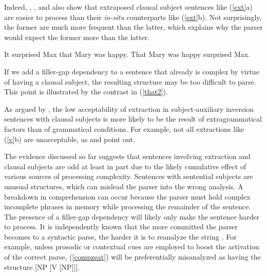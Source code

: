 \documentclass[output=paper,biblatex,babelshorthands,newtxmath,draftmode,colorlinks,citecolor=brown]{langscibook}
\begin{document}
\eal  \label{exps}
\zl


\noindent
Indeed, \citet{fodor67}, \citet{bever}, and \citet{frazier88} also show that extraposed clausal
subject sentences like (\ref{ext}a) are easier to process than their \textit{in-situ} counterparts
like (\ref{ext}b).  Not surprisingly, the former are much more frequent than the latter, which
explains why the parser would expect the former more than the latter.


\eal  \label{ext}
\ex It surprised Max that Mary was happy. 
\ex That Mary was happy surprised Max.
\zl

  
If we add a filler-gap dependency to a sentence that already is complex by virtue of having a
clausal subject, the resulting structure may be too difficult to parse.  This point is illustrated
by the contrast in (\ref{that2}).



\eal \label{that2}
\zl


\noindent
As argued by \citet{dubinsky2009}, the low acceptability of extraction in subject-auxiliary
inversion sentences with clausal subjects is more likely to be the result of extragrammatical
factors than of grammatical conditions.  For example, not all extractions like (\ref{v}b) are
unacceptable, as \citet[382--387]{delahunty} and \citet[115]{dubinsky2009} point out.

\eal \label{v}
\zl

The evidence discussed so far suggests that sentences involving extraction and clausal subjects are
odd at least in part due to the likely cumulative effect of various sources of processing
complexity.  Sentences with sentential subjects are unusual structures, which can mislead the parser
into the wrong analysis. A breakdown in comprehension can occur because the parser must hold complex
incomplete phrases in memory while processing the remainder of the sentence. The presence of a
filler-gap dependency will likely only make the sentence harder to process.  It is independently
known that the more committed the parser becomes to a syntactic parse, the harder it is to reanalyze
the string \citep{ferreirahend,ferreirahend2,tabor3}.  For example, unless prosodic or contextual
cues are employed to boost the activation of the correct parse, (\ref{compzeat}) will be
preferentially misanalyzed as having the structure [NP [V [NP]]].
\end{document}
